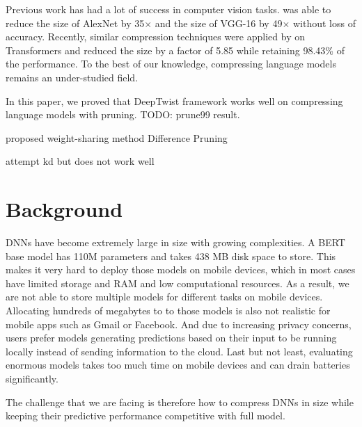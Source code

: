 \documentclass[10pt]{article}
\begin{document}
Previous work has had a lot of success in computer vision tasks.
\citet{han2015deep} was able to reduce the size of AlexNet by 35$\times$ and
the size of VGG-16 by 49$\times$ without loss of accuracy. Recently, similar
compression techniques were applied by \citet{cheong2014transformer} on
Transformers and reduced the size by a factor of 5.85 while retaining 98.43\%
of the performance. To the best of our knowledge, compressing language models
remains an under-studied field.

In this paper, we proved that DeepTwist framework works well on compressing
language models with pruning. {\color{red} TODO: prune99 result}.

proposed weight-sharing method Difference Pruning

attempt kd but does not work well

\section{Background}


DNNs have become extremely large in size with growing complexities. A BERT
base model has 110M parameters and takes 438 MB disk space to store. This
makes it very hard to deploy those models on mobile devices, which in most
cases have limited storage and RAM and low computational resources. As a
result, we are not able to store multiple models for different tasks on mobile
devices. Allocating hundreds of megabytes to to those models is also not
realistic for mobile apps such as Gmail or Facebook. And due to increasing
privacy concerns, users prefer models generating predictions based on their
input to be running locally instead of sending information to the cloud. Last
but not least, evaluating enormous models takes too much time on mobile
devices and can drain batteries significantly.

The challenge that we are facing is therefore how to compress DNNs in size
while keeping their predictive performance competitive with full model.
\end{document}
